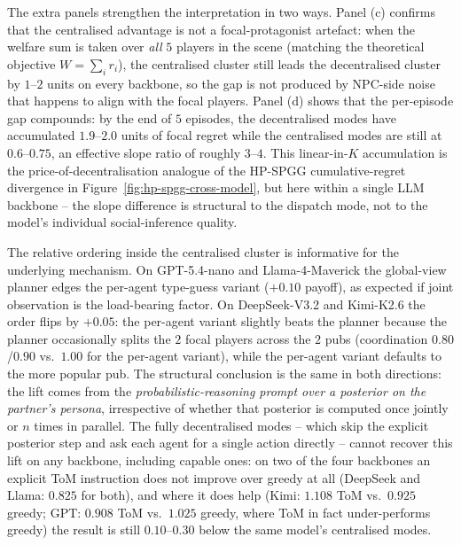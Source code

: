 The extra panels strengthen the interpretation in two ways. Panel (c) confirms that the centralised advantage is not a focal-protagonist artefact: when the welfare sum is taken over \emph{all} $5$ players in the scene (matching the theoretical objective $W = \sum_i r_i$), the centralised cluster still leads the decentralised cluster by $1$--$2$ units on every backbone, so the gap is not produced by NPC-side noise that happens to align with the focal players. Panel (d) shows that the per-episode gap compounds: by the end of $5$ episodes, the decentralised modes have accumulated $1.9$--$2.0$ units of focal regret while the centralised modes are still at $0.6$--$0.75$, an effective slope ratio of roughly $3$--$4$. This linear-in-$K$ accumulation is the price-of-decentralisation analogue of the HP-SPGG cumulative-regret divergence in Figure~\ref{fig:hp-spgg-cross-model}, but here within a single LLM backbone -- the slope difference is structural to the dispatch mode, not to the model's individual social-inference quality.

The relative ordering inside the centralised cluster is informative for the underlying mechanism. On GPT-5.4-nano and Llama-4-Maverick the global-view planner edges the per-agent type-guess variant ($+0.10$ payoff), as expected if joint observation is the load-bearing factor. On DeepSeek-V3.2 and Kimi-K2.6 the order flips by $+0.05$: the per-agent variant slightly beats the planner because the planner occasionally splits the $2$ focal players across the $2$ pubs (coordination $0.80$/$0.90$ vs.\ $1.00$ for the per-agent variant), while the per-agent variant defaults to the more popular pub. The structural conclusion is the same in both directions: the lift comes from the \emph{probabilistic-reasoning prompt over a posterior on the partner's persona}, irrespective of whether that posterior is computed once jointly or $n$ times in parallel. The fully decentralised modes -- which skip the explicit posterior step and ask each agent for a single action directly -- cannot recover this lift on any backbone, including capable ones: on two of the four backbones an explicit ToM instruction does not improve over greedy at all (DeepSeek and Llama: $0.825$ for both), and where it does help (Kimi: $1.108$ ToM vs.\ $0.925$ greedy; GPT: $0.908$ ToM vs.\ $1.025$ greedy, where ToM in fact under-performs greedy) the result is still $0.10$--$0.30$ below the same model's centralised modes.

